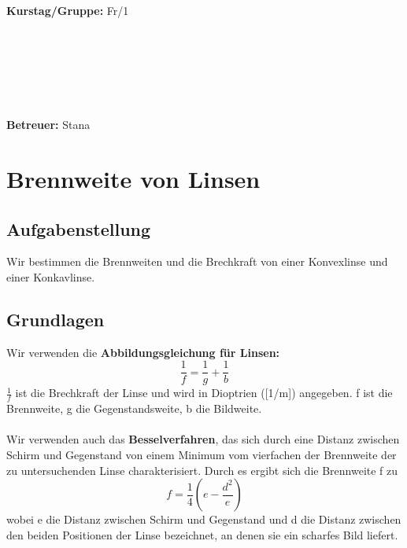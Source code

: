 \documentclass{article}
\begin{document}
\begin{verbatim}


\end{verbatim}
			\begin{flushleft}
			\textbf{\Large{Kurstag/Gruppe:}} \Large{Fr/1}
			\end{flushleft}

\begin{verbatim}






\end{verbatim}
			\begin{flushleft}
			\LARGE{\textbf{Betreuer:}}	\Large{Stana}	
			\end{flushleft}
\newpage	

\section{Brennweite von Linsen}

\subsection{Aufgabenstellung}
Wir bestimmen die Brennweiten und die Brechkraft von einer Konvexlinse und einer Konkavlinse.
\subsection{Grundlagen}
Wir verwenden die \textbf{Abbildungsgleichung für Linsen:}
\begin{equation}
\label{linsengleichung}
\frac{1}{f}=\frac{1}{g}+\frac{1}{b}
\end{equation}
$\frac{1}{f}$ ist die Brechkraft der Linse und wird in Dioptrien ([1/m]) angegeben. f ist die Brennweite, g die Gegenstandsweite, b die Bildweite.\\ 
\\
Wir verwenden auch das \textbf{Besselverfahren}, das sich durch eine Distanz zwischen Schirm und Gegenstand von einem Minimum vom vierfachen der Brennweite der zu untersuchenden Linse charakterisiert. Durch es ergibt sich die Brennweite f zu 
\begin{equation}
\label{bessel}
f=\frac{1}{4}(e-\frac{d^2}{e})
\end{equation}
wobei e die Distanz zwischen Schirm und Gegenstand und d die Distanz zwischen den beiden Positionen der Linse bezeichnet, an denen sie ein scharfes Bild liefert.
\end{document}
